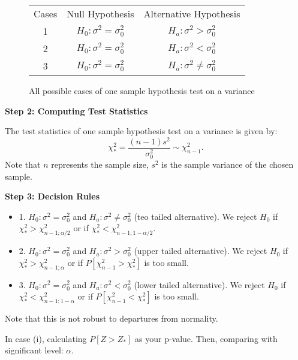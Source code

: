 \begin{center}
\begin{figure}[H]
\centering
\begin{tabular}{ c c c }
Cases & Null Hypothesis & Alternative Hypothesis \\
     1	   & $H_0: \sigma^2 = \sigma_0^2$ & $H_a: \sigma^2 > \sigma_0^2$ \\
     2	   & $H_0: \sigma^2 = \sigma_0^2$ & $H_a: \sigma^2 < \sigma_0^2$ \\
     3    & $H_0: \sigma^2 = \sigma_0^2$ & $H_a: \sigma^2 \neq \sigma_0^2$ \\
\end{tabular}
\caption{All possible cases of one sample hypothesis test on a variance}
\end{figure}
\end{center}
\vspace{-2.00em}

\textbf{Step 2: Computing Test Statistics}

\begin{definition}
The test statistics of one sample hypothesis test on a variance is given by: \[ \chi_*^2 = \frac{(n-1)s^2}{\sigma_0^2} \sim \chi_{n-1}^2.\]
Note that $n$ represents the sample size, $s^2$ is the sample variance of the chosen sample.
\end{definition}

\textbf{Step 3: Decision Rules}

\begin{itemize}
	\item 1. $H_0: \sigma^2 = \sigma_0^2$ and $H_a: \sigma^2 \neq \sigma_0^2$ (teo tailed alternative). We reject $H_0$ if $\chi_*^2 > \chi_{n-1;\alpha/2}^2$ or if $\chi_*^2 < \chi_{n-1;1-\alpha/2}^2$.
	\item 2. $H_0: \sigma^2 = \sigma_0^2$ and $H_a: \sigma^2 > \sigma_0^2$ (upper tailed alternative). We reject $H_0$ if $\chi_*^2 > \chi_{n-1;\alpha}^2$ or if $P[\chi_{n-1}^2 > \chi_*^2]$ is too small.
	\item 3. $H_0: \sigma^2 = \sigma_0^2$ and $H_a: \sigma^2 < \sigma_0^2$ (lower tailed alternative). We reject $H_0$ if $\chi_*^2 < \chi_{n-1;1-\alpha}^2$ or if $P[\chi_{n-1}^2 < \chi_*^2]$ is too small.
\end{itemize}

Note that this is not robust to departures from normality.


In case (i), calculating $P[Z > Z_*]$ as your p-value. Then, comparing with significant level: $\alpha$.

